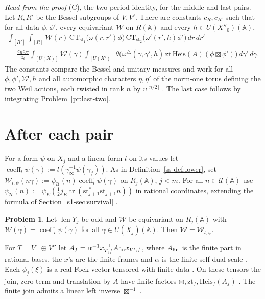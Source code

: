 \documentclass[reqno]{amsart}
\theoremstyle{definition}
\newtheorem{problem}{Problem}[section]
\theoremstyle{plain}
\theoremstyle{remark}
\newcommand{\A}{\mathbb{A}}
\newcommand{\Uc}{\mathcal{U}}
\newcommand{\Wc}{\mathcal{W}}
\newcommand{\Heis}{\mathrm{Heis}}
\newcommand{\st}{\mathrm{st}}
\newcommand{\CT}{\mathrm{CT}}
\newcommand{\zt}{\mathrm{zt}}
\newcommand{\coeff}{\operatorname{coeff}}
\newcommand{\len}{\operatorname{len}}
\begin{document}
\emph{Read from the proof} (C), the two-period identity, for the middle and last pairs.  Let \(R, R'\) be the Bessel subgroups of \(V, V'\).  There are constants \(c_R, c_{R'}\) such that for all data \(\phi, \phi'\), every equivariant \(\Wc\) on \(R(\A)\) and every \(h \in U(X''_0)(\A)\),
\begin{multline}\label{eq:two-periods}
  \int_{[R']}\!\int_{[R]} \Wc(r)\,\CT_{\st_1}\bigl(\omega(r, r')\phi\bigr)\,\CT_{\st_2}\bigl(\omega'(r', h)\phi'\bigr)\,dr\,dr' \\
  = \frac{c_R c_{R'}}{z_\theta} \int_{[U(X)]} \Wc(\gamma) \int_{[U(X')]} \theta\bigl(\omega^\triangle(\gamma, \gamma', \bar h)\,\zt\,\Heis(A)(\phi \boxtimes \phi')\bigr)\,d\gamma'\,d\gamma .
\end{multline}
The constants compare the Bessel and unitary measures and work for all \(\phi,\phi',\Wc,h\) and all automorphic characters \(\eta,\eta'\) of the norm-one torus defining the two Weil actions, each twisted in rank \(n\) by \(\upsilon^{\lfloor n/2\rfloor}\) \cite[UnfoldingStages, lines 457--484, and DualPair/Defs, line 153]{GL}.  The last case follows by integrating Problem~\ref{pr:last-two}.


\section{After each pair}\label{sec:induction}

For a form \(\psi\) on \(X_j\) and a linear form \(l\) on its values let \(\coeff_l\psi(\gamma):=l(\gamma_\infty^{-1}\psi(\gamma_f))\).  As in Definition~\ref{ss-def:lower}, set \(\Wc_{l,\psi}(n\gamma):=\psi_\Uc(n)\coeff_l\psi(\gamma)\) on \(R_j(\A)\), \(j<m\).  For all \(n\in\Uc(\A)\) use \(\psi_\Uc(n):=\psi_E(\tfrac12j_E\operatorname{tr}(\st_{j+1}^*\st_{j+1}n))\) in rational coordinates, extending the formula of Section~\ref{s1-sec:survival} \cite[Equivariant, lines 220, 293--303]{GL}.

\begin{problem}\label{pr:sourcefn}
Let \(\len Y_j\) be odd and \(\Wc\) be equivariant on \(R_j(\A)\) with \(\Wc(\gamma) = \coeff_l\psi(\gamma)\) for all \(\gamma \in U(X_j)(\A)\).  Then \(\Wc = \Wc_{l,\psi}\).
\end{problem}

For \(T=V^-\oplus V''\) let \(A_f=\alpha^{-1}x_{T,f}^{-1}A_{\rm fin}x_{V',f}\), where \(A_{\rm fin}\) is the finite part in rational bases, the \(x\)'s are the finite frames and \(\alpha\) is the finite self-dual scale \cite[WeilAction, line 785]{GL}.  Each \(\phi_j(\xi)\) is a real Fock vector tensored with finite data \cite[RowChain, lines 73--77]{GL}.  On these tensors the join, zero term and translation by \(A\) have finite factors \(\boxtimes,\zt_f,\Heis_f(A_f)\) \cite[UnfoldingStages, lines 737--745, and EdgePairEvaluation, lines 157--166]{GL}.  The finite join admits a linear left inverse \(\boxtimes^{-1}\) \cite[TwoEdges, line 238, and EdgePairEvaluation, lines 162, 853--871]{GL}.
\end{document}
